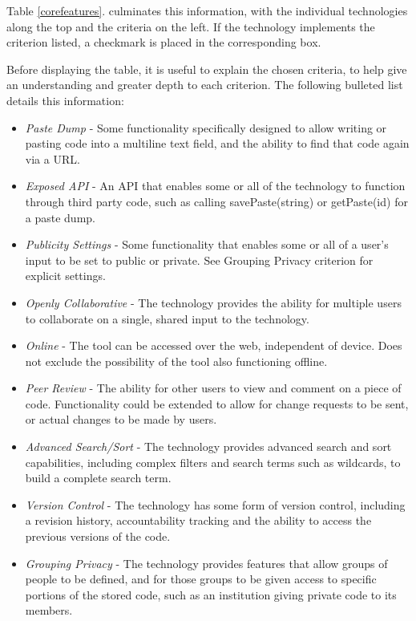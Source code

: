 Table \ref{corefeatures}.
culminates this information, with the individual technologies along the top and the criteria on the left.
If the technology implements the criterion listed, a checkmark is placed in the corresponding box.

Before displaying the table, it is useful to explain the chosen criteria, to help give an understanding and greater depth to each criterion.
The following bulleted list details this information:

\begin{itemize}
\item \textit{Paste Dump} - Some functionality specifically designed to allow writing or pasting code into a multiline text field, and the ability to find that code again via a URL.
\item \textit{Exposed API} - An API that enables some or all of the technology to function through third party code, such as calling savePaste(string) or getPaste(id) for a paste dump.
\item \textit{Publicity Settings} - Some functionality that enables some or all of a user's input to be set to public or private.
See Grouping Privacy criterion for explicit settings.
\item \textit{Openly Collaborative} - The technology provides the ability for multiple users to collaborate on a single, shared input to the technology.
\item \textit{Online} - The tool can be accessed over the web, independent of device.
Does not exclude the possibility of the tool also functioning offline.
\item \textit{Peer Review} - The ability for other users to view and comment on a piece of code.
Functionality could be extended to allow for change requests to be sent, or actual changes to be made by users.
\item \textit{Advanced Search/Sort} - The technology provides advanced search and sort capabilities, including complex filters and search terms such as wildcards, to build a complete search term. 
\item \textit{Version Control} - The technology has some form of version control, including a revision history, accountability tracking and the ability to access the previous versions of the code. 
\item \textit{Grouping Privacy} - The technology provides features that allow groups of people to be defined, and for those groups to be given access to specific portions of the stored code, such as an institution giving private code to its members.

\end{itemize}
